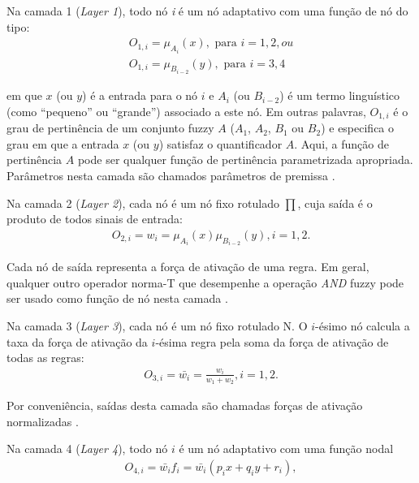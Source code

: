 
Na camada 1 (\textit{Layer 1}), todo nó \textit{i} é um nó adaptativo com uma função de nó do tipo:
\begin{align*}
    O_{1,i} = \mu_{A_{i}}(x), \mbox{ para } i = 1, 2, ou\\
    O_{1,i} = \mu_{B_{i-2}}(y), \mbox{ para } i = 3, 4
\end{align*}

em que $x$ (ou $y$) é a entrada para o nó $i$ e $A_{i}$ (ou $B_{i-2}$) é um termo linguístico (como ``pequeno'' ou ``grande'') associado a este nó. Em outras palavras, $O_{1,i}$ é o grau de pertinência de um conjunto fuzzy $A$ ($A_1$, $A_2$, $B_1$ ou $B_2$) e especifica o grau em que a entrada $x$ (ou $y$) satisfaz o quantificador $A$. Aqui, a função de pertinência $A$ pode ser qualquer função de pertinência parametrizada apropriada. Parâmetros nesta camada são chamados parâmetros de premissa \cite[p.~336]{Jang1997}.

Na camada 2 (\textit{Layer 2}), cada nó é um nó fixo rotulado $\prod$, cuja saída é o produto de todos sinais de entrada:
\begin{align*}
    O_{2,i} = w_i = \mu_{A_{i}}(x)\mu_{B_{i-2}}(y), i = 1, 2.
\end{align*}

Cada nó de saída representa a força de ativação de uma regra. Em geral, qualquer outro operador norma-T que desempenhe a operação \textit{AND} fuzzy pode ser usado como função de nó nesta camada \cite[p.~336]{Jang1997}.

Na camada 3 (\textit{Layer 3}), cada nó é um nó fixo rotulado N. O $i$-ésimo nó calcula a taxa da força de ativação da $i$-ésima regra pela soma da força de ativação de todas as regras:
\begin{align*}
    O_{3,i} = \bar{w_i} = \frac{w_i}{w_1 + w_2}, i = 1, 2.
\end{align*}

Por conveniência, saídas desta camada são chamadas forças de ativação normalizadas \cite[p.~336]{Jang1997}.

Na camada 4 (\textit{Layer 4}), todo nó $i$ é um nó adaptativo com uma função nodal
\begin{align*}
    O_{4,i} = \bar{w_i}f_i = \bar{w_i}(p_ix+q_iy+r_i),
\end{align*}

